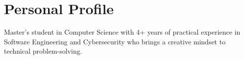 \section*{Personal Profile}

Master’s student in Computer Science with 4+ years of practical experience in Software Engineering and Cybersecurity who brings a creative mindset to technical problem-solving.